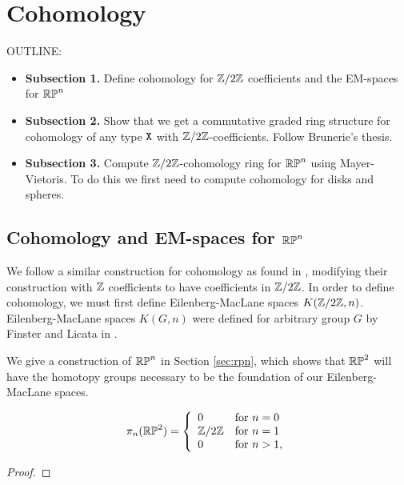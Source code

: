 \documentclass{amsart}
\begin{document}
\section{Cohomology}
\label{sec:cohom}

OUTLINE:
\begin{itemize}
\item 
  \textbf{Subsection 1.} 
  Define cohomology for $ \mathbb{Z}/2\mathbb{Z} $ coefficients and the
  EM-spaces for $ \mathbb{RP}^n $ 
\item
  \textbf{Subsection 2.} Show that we get a commutative
  graded ring structure for cohomology of any type $ \mathtt{X} $
  with $ \mathbb{Z}/2\mathbb{Z} $-coefficients. Follow Brunerie's thesis.
\item
  \textbf{Subsection 3.} Compute $ \mathbb{Z}/2\mathbb{Z} $-cohomology ring
  for $ \mathbb{RP}^n $ using Mayer-Vietoris.  To do this we 
  first need to compute cohomology for disks and spheres.  
\end{itemize}


\subsection{Cohomology and EM-spaces for $\mathbb{RP}^n$}


We follow a similar construction for cohomology as found in \cite{brunerie:thesis}, modifying their construction with $\mathbb{Z}$ coefficients to have coefficients in $\mathbb{Z}/2\mathbb{Z}$. In order to define cohomology, we must first define Eilenberg-MacLane spaces $K(\mathbb{Z}/2\mathbb{Z},n)$. Eilenberg-MacLane spaces $K(G,n)$ were defined for arbitrary group $G$ by Finster and Licata in \cite{fl:em}.

We give a construction of $\mathbb{RP}^n$ in Section \ref{sec:rpn}, which shows that $\mathbb{RP}^2$ will have the homotopy groups necessary to be the foundation of our Eilenberg-MacLane spaces. 
\begin{proposition}\label{prop:rpnhtpygps} %
	\[ \pi_n(\mathbb{RP}^2)=\left\{ \begin{array}{ll} 0 & \text{for }n=0\\
	\mathbb{Z}/2\mathbb{Z} & \text{for } n=1\\
	0 & \text{for } n> 1, 
	\end{array}\right.\]
\end{proposition}
\begin{proof}
\end{proof}
\end{document}
